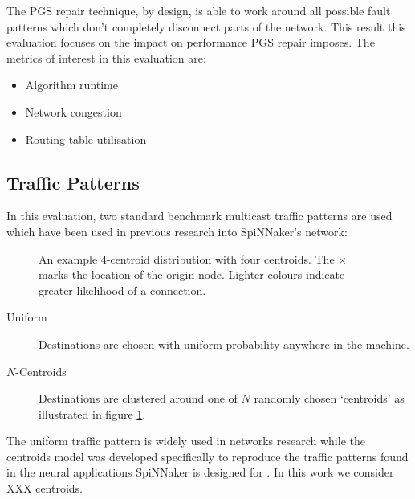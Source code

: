 		The PGS repair technique, by design, is able to work around all possible
		fault patterns which don't completely disconnect parts of the network. This
		result this evaluation focuses on the impact on performance PGS repair
		imposes. The metrics of interest in this evaluation are:
		
		\begin{itemize}
			\item Algorithm runtime
			\item Network congestion
			\item Routing table utilisation
		\end{itemize}
		
		\subsection{Traffic Patterns}
			
			In this evaluation, two standard benchmark multicast traffic patterns are
			used which have been used in previous research into SpiNNaker's network:
			
			\begin{figure}
				\center
				
				\caption{An example 4-centroid distribution with four centroids. The
				$\times$ marks the location of the origin node. Lighter colours
				indicate greater likelihood of a connection.}
				\label{fig:traffic-distribution-centroids}
			\end{figure}
			
			\begin{description}
				
				\item[Uniform] Destinations are chosen with uniform probability
				anywhere in the machine.
				
				\item[$N$-Centroids] Destinations are clustered around one of $N$
				randomly chosen `centroids' as illustrated in figure
				\ref{fig:traffic-distribution-centroids}.
				
			\end{description}
			
			The uniform traffic pattern is widely used in networks research
			\cite{dally04,davies12} while the centroids model was developed
			specifically to reproduce the traffic patterns found in the neural
			applications SpiNNaker is designed for \cite{navaridas14}. In this work
			we consider XXX centroids.
		
